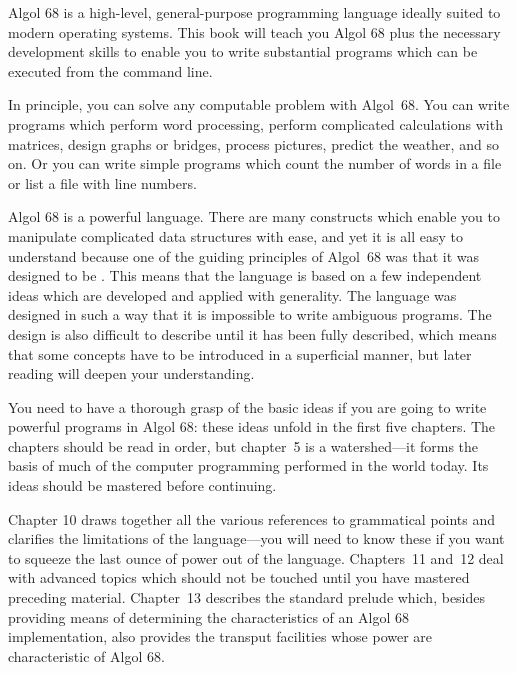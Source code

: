 %
%
Algol 68 is a high-level, general-purpose programming language ideally
suited to modern operating systems.  This book will teach you Algol 68
plus the necessary development skills to enable you to write
substantial programs which can be executed from the command line.

In principle, you can solve any computable problem with Algol~68.
You can write programs which perform word processing, perform
complicated calculations with matrices, design graphs or bridges,
process pictures, predict the weather, and so on.  Or you can write
simple programs which count the number of words in a file or list a
file with line numbers.

Algol 68 is a powerful language.  There are many constructs which
enable you to manipulate complicated data structures with ease, and
yet it is all easy to understand because one of the guiding
principles of Algol~68 was that it was designed to be
. This means that the
language is based on a few independent ideas which are developed and
applied with generality.  The language was designed in such a way
that it is impossible to write ambiguous programs.  The design is
also difficult to describe until it has been fully described, which
means that some concepts have to be introduced in a superficial
manner, but later reading will deepen your understanding.

You need to have a thorough grasp of the basic ideas if you are going
to write powerful programs in Algol 68: these ideas unfold in the
first five chapters.  The chapters should be read in order, but
chapter~5 is a watershed---it forms the basis of much of the computer
programming performed in the world today.  Its ideas should be
mastered before continuing.

Chapter 10 draws together all the various references to grammatical
points and clarifies the limitations of the language---you will need
to know these if you want to squeeze the last ounce of power out of
the language. Chapters~11 and~12 deal with advanced topics which
should not be touched until you have mastered preceding material.
Chapter~13 describes the standard prelude which, besides providing
means of determining the characteristics of an Algol 68
implementation, also provides the transput facilities whose power are
characteristic of Algol 68.

